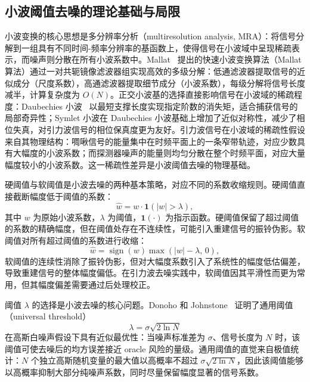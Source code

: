 \subsection{小波阈值去噪的理论基础与局限}

小波变换的核心思想是多分辨率分析（multiresolution analysis, MRA）：将信号分解到一组具有不同时间-频率分辨率的基函数上，使得信号在小波域中呈现稀疏表示，而噪声则分散在所有小波系数中。Mallat~\cite{Mallat1989wavelet} 提出的快速小波变换算法（Mallat算法）通过一对共轭镜像滤波器组实现高效的多级分解：低通滤波器提取信号的近似成分（尺度系数），高通滤波器提取细节成分（小波系数），每级分解将信号长度减半，计算复杂度为 $O(N)$。正交小波基的选择直接影响信号在小波域的稀疏程度：Daubechies 小波~\cite{Daubechies1988wavelet} 以最短支撑长度实现指定阶数的消失矩，适合捕获信号的局部奇异性；Symlet 小波在 Daubechies 小波基础上增加了近似对称性，减少了相位失真，对引力波信号的相位保真度更为友好。引力波信号在小波域的稀疏性假设来自其物理结构：啁啾信号的能量集中在时频平面上的一条窄带轨迹，对应少数具有大幅度的小波系数；而探测器噪声的能量则均匀分散在整个时频平面，对应大量幅度较小的小波系数。这一稀疏性差异是小波阈值去噪的物理基础。

硬阈值与软阈值是小波去噪的两种基本策略，对应不同的系数收缩规则。硬阈值直接截断幅度低于阈值的系数：
\begin{equation}
  \hat{w} = w \cdot \mathbf{1}(|w| > \lambda),
\end{equation}
其中 $w$ 为原始小波系数，$\lambda$ 为阈值，$\mathbf{1}(\cdot)$ 为指示函数。硬阈值保留了超过阈值的系数的精确幅度，但在阈值处存在不连续性，可能引入重建信号的振铃伪影。软阈值对所有超过阈值的系数进行收缩：
\begin{equation}
  \hat{w} = \operatorname{sign}(w) \max(|w| - \lambda,\, 0),
\end{equation}
软阈值的连续性消除了振铃伪影，但对大幅度系数引入了系统性的幅度低估偏差，导致重建信号的整体幅度偏低。在引力波去噪实践中，软阈值因其平滑性而更为常用，但其幅度偏差需要通过后处理校正。

阈值 $\lambda$ 的选择是小波去噪的核心问题。Donoho 和 Johnstone~\cite{Donoho1994wavelet} 证明了通用阈值（universal threshold）
\begin{equation}
  \lambda = \sigma \sqrt{2 \ln N}
\end{equation}
在高斯白噪声假设下具有近似最优性：当噪声标准差为 $\sigma$、信号长度为 $N$ 时，该阈值可使去噪后的均方误差接近 oracle 风险的量级。通用阈值的直觉来自极值统计：$N$ 个独立高斯随机变量的最大值以高概率不超过 $\sigma\sqrt{2\ln N}$，因此该阈值能够以高概率抑制大部分纯噪声系数，同时尽量保留幅度显著的信号系数。

